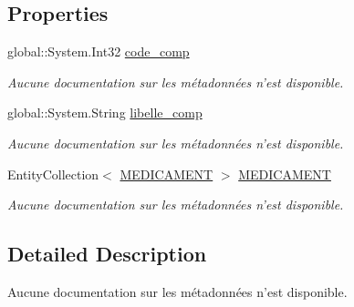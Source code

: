 \subsection*{Properties}
\begin{DoxyCompactItemize}
\item 
global\-::\-System.\-Int32 \hyperlink{class_model_1_1_c_o_m_p_o_s_a_n_t_a29f8a5ee13f9d217125a207dcf378c2c}{code\-\_\-comp}
\begin{DoxyCompactList}\small\item\em Aucune documentation sur les métadonnées n'est disponible. \end{DoxyCompactList}\item 
global\-::\-System.\-String \hyperlink{class_model_1_1_c_o_m_p_o_s_a_n_t_a238618dd950cff9c1d8cced54be482bb}{libelle\-\_\-comp}
\begin{DoxyCompactList}\small\item\em Aucune documentation sur les métadonnées n'est disponible. \end{DoxyCompactList}\item 
Entity\-Collection$<$ \hyperlink{class_model_1_1_m_e_d_i_c_a_m_e_n_t}{M\-E\-D\-I\-C\-A\-M\-E\-N\-T} $>$ \hyperlink{class_model_1_1_c_o_m_p_o_s_a_n_t_a84bbd2e702acaac88ac584599f8f26a1}{M\-E\-D\-I\-C\-A\-M\-E\-N\-T}
\begin{DoxyCompactList}\small\item\em Aucune documentation sur les métadonnées n'est disponible. \end{DoxyCompactList}\end{DoxyCompactItemize}


\subsection{Detailed Description}
Aucune documentation sur les métadonnées n'est disponible. 




